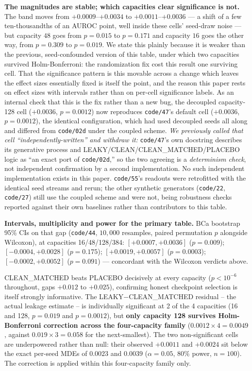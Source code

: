 \documentclass[10pt]{article} %
\begin{document}
\textbf{The magnitudes are stable; which capacities clear significance is
not.} The band moves from $+0.0009$--$+0.0034$ to $+0.0011$--$+0.0036$ --- a
shift of a few ten-thousandths of an AUROC point, well inside these cells'
seed-draw noise --- but capacity $48$ goes from $p=0.015$ to $p=0.171$ and
capacity $16$ goes the other way, from $p=0.309$ to $p=0.019$. We state this
plainly because it is weaker than the previous, seed-confounded version of this
table, under which two capacities survived Holm-Bonferroni: the randomization
fix cost this result one surviving cell. That the significance pattern is this
movable across a change which leaves the effect sizes essentially fixed is
itself the point, and the reason this paper rests on effect sizes with
intervals rather than on per-cell significance labels. As an internal check
that this is the fix rather than a new bug, the decoupled capacity-128 cell
($+0.0036$, $p=0.0012$) now reproduces \texttt{code/47}'s default cell
($+0.0036$, $p=0.0012$), the identical configuration, which had used decoupled
seeds all along and differed from \texttt{code/02d} under the coupled scheme.
\emph{We previously called that cell ``independently-written'' and withdraw
it:} \texttt{code/47}'s own docstring describes its generative process and
LEAKY/CLEAN/CLEAN\_MATCHED/PLACEBO logic as ``an exact port of
\texttt{code/02d},'' so the two agreeing is a \emph{determinism check}, not
independent confirmation by a second implementation. No such independent
implementation exists in this paper. \texttt{code/55}'s readouts were
retrofitted with the identical seed streams and rerun; the other synthetic
generators (\texttt{code/22}, \texttt{code/27}) still use the coupled scheme
and were not, being robustness checks reported against their own baselines
rather than contributors to this table.


\medskip\noindent\textbf{Intervals, multiplicity and power for the primary table.} BCa bootstrap 95\% CIs on that gap (\texttt{code/44}, $10{,}000$ resamples,
paired permutation $p$ alongside Wilcoxon), at capacities 16/48/128/384:
$[+0.0007,+0.0036]$ ($p=0.009$); $[-0.0004,+0.0028]$ ($p=0.175$);
$[+0.0019,+0.0057]$ ($p=0.0003$); $[-0.0002,+0.0052]$ ($p=0.091$) ---
concordant with the Wilcoxon verdicts above.

CLEAN\_MATCHED beats PLACEBO decisively at every capacity
($p<10^{-6}$ throughout, gaps $+0.012$ to $+0.025$), confirming honest
checkpoint selection is itself strongly informative. The
LEAKY$-$CLEAN\_MATCHED residual -- the actual leakage estimate -- is
individually significant at 2 of the 4 capacities (16 and 128, $p=0.019$ and
$p=0.0012$), but \textbf{only capacity 128 survives Holm-Bonferroni correction
across the four-capacity family} ($0.0012\times4=0.0049$, against
$0.019\times3=0.058$ for the next-smallest). The two non-significant cells are
underpowered rather than null: their observed $+0.0011$ and $+0.0024$ sit below
the exact per-seed MDEs of $0.0023$ and $0.0039$ ($\alpha=0.05$, $80\%$ power,
$n=100$). The correction is applied within this four-capacity family only.
\end{document}
